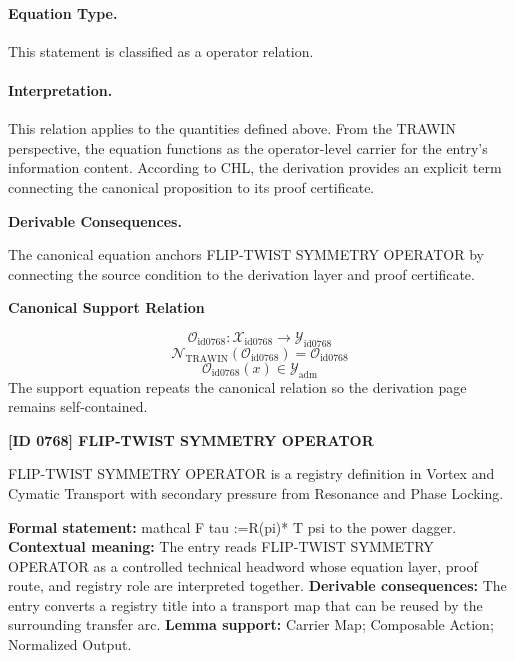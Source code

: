 \paragraph{Equation Type.}
This statement is classified as a operator relation.

\paragraph{Interpretation.}
This relation applies to the quantities defined above. From the TRAWIN perspective, the equation functions as the operator-level carrier for the entry’s information content. According to CHL, the derivation provides an explicit term connecting the canonical proposition to its proof certificate.

\par\vspace{0.35em}
\noindent\textbf{Derivable Consequences.}\quad
\begingroup
\footnotesize
\raggedright
The canonical equation anchors FLIP-TWIST SYMMETRY OPERATOR by connecting the source condition to the derivation layer and proof certificate.
\par\endgroup

\noindent\textbf{Canonical Support Relation}\par
\[
\mathcal{O}_{\mathrm{id0768}}:\mathcal{X}_{\mathrm{id0768}}\longrightarrow\mathcal{Y}_{\mathrm{id0768}}
\]
\[
\mathcal{N}_{\mathrm{TRAWIN}}(\mathcal{O}_{\mathrm{id0768}})=\mathcal{O}_{\mathrm{id0768}}
\]
\[
\mathcal{O}_{\mathrm{id0768}}(x)\in\mathcal{Y}_{\mathrm{adm}}
\]
\noindent The support equation repeats the canonical relation so the derivation page remains self-contained.\par

\clearpage
\noindent\textbf{[ID 0768] FLIP-TWIST SYMMETRY OPERATOR}\par
\vspace{0.35em}
\begingroup\small
{}
FLIP-TWIST SYMMETRY OPERATOR is a registry definition in Vortex and Cymatic Transport with secondary pressure from Resonance and Phase Locking.

\begingroup\footnotesize\setlength{\emergencystretch}{3em}\sloppy
\textbf{Formal statement:} mathcal F tau :=R(pi)* T psi to the power dagger. \textbf{Contextual meaning:} The entry reads FLIP-TWIST SYMMETRY OPERATOR as a controlled technical headword whose equation layer, proof route, and registry role are interpreted together. \textbf{Derivable consequences:} The entry converts a registry title into a transport map that can be reused by the surrounding transfer arc. \textbf{Lemma support:} Carrier Map; Composable Action; Normalized Output.\par
\endgroup

